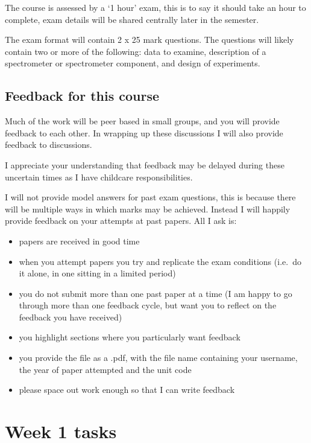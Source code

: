 \documentclass[
]{book}
\providecommand{\tightlist}{%
  \setlength{\itemsep}{0pt}\setlength{\parskip}{0pt}}
\begin{document}
The course is assessed by a `1 hour' exam, this is to say it should take an hour to complete, exam details will be shared centrally later in the semester.

The exam format will contain 2 x 25 mark questions. The questions will likely contain two or more of the following: data to examine, description of a spectrometer or spectrometer component, and design of experiments.

\hypertarget{feedback-for-this-course}{%
\subsection*{Feedback for this course}\label{feedback-for-this-course}}

Much of the work will be peer based in small groups, and you will provide feedback to each other. In wrapping up these discussions I will also provide feedback to discussions.

I appreciate your understanding that feedback may be delayed during these uncertain times as I have childcare responsibilities.

I will not provide model answers for past exam questions, this is because there will be multiple ways in which marks may be achieved. Instead I will happily provide feedback on your attempts at past papers. All I ask is:

\begin{itemize}
\tightlist
\item
  papers are received in good time
\item
  when you attempt papers you try and replicate the exam conditions (i.e.~do it alone, in one sitting in a limited period)
\item
  you do not submit more than one past paper at a time (I am happy to go through more than one feedback cycle, but want you to reflect on the feedback you have received)
\item
  you highlight sections where you particularly want feedback
\item
  you provide the file as a .pdf, with the file name containing your username, the year of paper attempted and the unit code
\item
  please space out work enough so that I can write feedback
\end{itemize}

\hypertarget{week-1-tasks}{%
\section*{Week 1 tasks}\label{week-1-tasks}}
\end{document}
